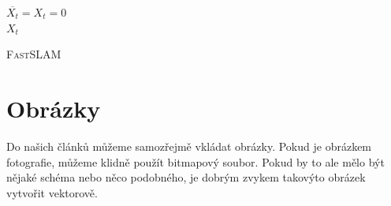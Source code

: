 \documentclass[a4paper, 11pt]{article}
\begin{document}
\bigskip

\medskip 

\IncMargin{1.6em}
\begin{algorithm}[H]

    \Indm\Indmm
        \SetNlSty{}{}{:}
    \BlankLine
	\Indp\Indpp
	$\overline{X_t} = X_t = 0$\\
	\Return$X_t$
	\caption{\textsc{FastSLAM}}
	\label{algorithm}
\end{algorithm}

\bigskip


\section{Obrázky}
    Do našich článků můžeme samozřejmě vkládat obrázky. Pokud je obrázkem fotografie, můžeme klidně použít bitmapový soubor. Pokud by to ale mělo být nějaké schéma nebo něco podobného, je dobrým zvykem takovýto obrázek vytvořit vektorově.
    
\end{document}
